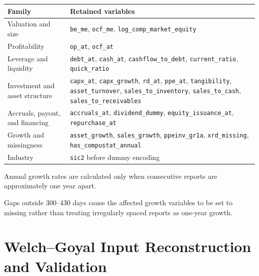 \documentclass[11pt,a4paper]{article}
\newcommand{\code}[1]{\texttt{#1}}
\begin{document}
\begin{center}
\small
\begin{tabularx}{\textwidth}{p{4.0cm}Y}
\toprule
Family & Retained variables \\
\midrule

Valuation and size
&
\code{be\_me},
\code{ocf\_me},
\code{log\_comp\_market\_equity}
\\

Profitability
&
\code{op\_at},
\code{ocf\_at}
\\

Leverage and liquidity
&
\code{debt\_at},
\code{cash\_at},
\code{cashflow\_to\_debt},
\code{current\_ratio},
\code{quick\_ratio}
\\

Investment and asset structure
&
\code{capx\_at},
\code{capx\_growth},
\code{rd\_at},
\code{ppe\_at},
\code{tangibility},
\code{asset\_turnover},
\code{sales\_to\_inventory},
\code{sales\_to\_cash},
\code{sales\_to\_receivables}
\\

Accruals, payout, and financing
&
\code{accruals\_at},
\code{dividend\_dummy},
\code{equity\_issuance\_at},
\code{repurchase\_at}
\\

Growth and missingness
&
\code{asset\_growth},
\code{sales\_growth},
\code{ppeinv\_gr1a},
\code{xrd\_missing},
\code{has\_compustat\_annual}
\\

Industry
&
\code{sic2} before dummy encoding
\\

\bottomrule
\end{tabularx}
\end{center}

Annual growth rates are calculated only when consecutive reports are
approximately one year apart.

Gaps outside 300--430 days cause the affected growth variables to be set to
missing rather than treating irregularly spaced reports as one-year growth.


\section{Welch--Goyal Input Reconstruction and Validation}
\end{document}
